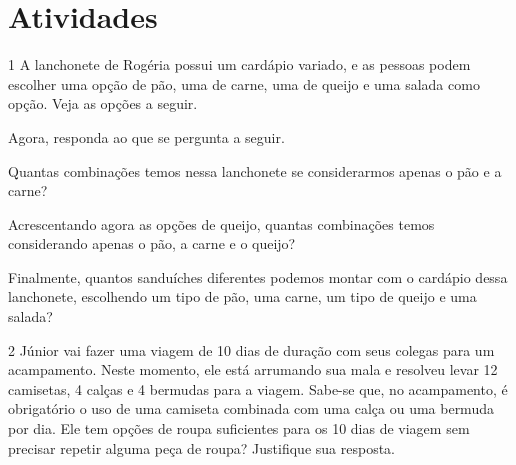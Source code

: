\section*{Atividades}

\num{1} A lanchonete de Rogéria possui um cardápio variado, e as pessoas podem
escolher uma opção de pão, uma de carne, uma de queijo e uma salada como opção.
Veja as opções a seguir.


Agora, responda ao que se pergunta a seguir.

\begin{escolha}
\item
  Quantas combinações temos nessa lanchonete se considerarmos apenas o
  pão e a carne?

\item
  Acrescentando agora as opções de queijo, quantas combinações temos
  considerando apenas o pão, a carne e o queijo?

\item
  Finalmente, quantos sanduíches diferentes podemos montar com o
  cardápio dessa lanchonete, escolhendo um tipo de pão, uma carne, um tipo de queijo e uma
  salada?
\end{escolha}

\num{2} Júnior vai fazer uma viagem de 10 dias de duração com seus colegas para
um acampamento. Neste momento, ele está arrumando sua mala e resolveu
levar 12 camisetas, 4 calças e 4 bermudas para a viagem. Sabe-se que, no
acampamento, é obrigatório o uso de uma camiseta combinada com uma calça
ou uma bermuda por dia. Ele tem opções de roupa suficientes para os 10 dias de viagem sem
precisar repetir alguma peça de roupa? Justifique sua resposta.


